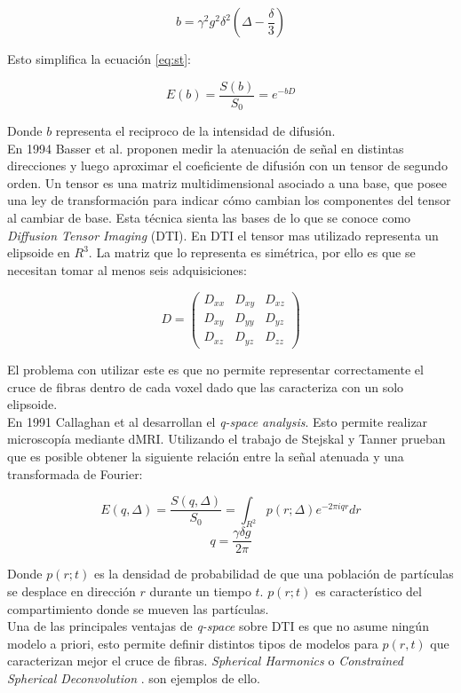 $$ b = \gamma^2 g^2 \delta^2 \left(\Delta - \frac{\delta}{3}\right) $$ 

Esto simplifica la ecuaci\'on \ref{eq:st}:  

$$ E(b) = \frac{S(b)}{S_0} = e^{-b D} $$

Donde $b$ representa el reciproco de la intensidad de difusi\'on. \\

En 1994 Basser et al. \cite{Basser1994} proponen medir la atenuaci\'on de se\~nal
en distintas direcciones y luego aproximar el coeficiente de difusi\'on con un 
tensor de segundo orden. Un tensor es una matriz multidimensional asociado a una
base, que posee una ley de transformaci\'on  para indicar  c\'omo cambian los 
componentes del tensor al cambiar de base. Esta t\'ecnica sienta las bases de lo
que se conoce como \textit{Diffusion Tensor Imaging} (DTI). En DTI el tensor 
mas utilizado representa un elipsoide en $R^3$. La matriz que lo representa
es  sim\'etrica, por ello es que se necesitan tomar al menos seis adquisiciones: 

$$
    D =
    \begin{pmatrix}
             D_{xx} & D_{xy} & D_{xz} \\
             D_{xy} & D_{yy} & D_{yz} \\
             D_{xz} & D_{yz} & D_{zz}    
    \end{pmatrix}
$$

\vspace{0.1cm}

El problema con utilizar este es que no permite representar correctamente
el cruce de fibras dentro de cada voxel dado que las caracteriza con un solo
elipsoide.\\

En 1991 Callaghan et al \cite{Callaghan1991} desarrollan el \textit{q-space analysis}.
Esto permite realizar microscop\'ia mediante dMRI. Utilizando el trabajo de Stejskal
y Tanner prueban que es posible obtener la siguiente relaci\'on entre la se\~nal
atenuada y una transformada de Fourier:

$$E(q,\Delta) =  \frac{S(q,\Delta)}{S_0} = \int_{R^2}{p(r;\Delta)e^{-2\pi i q r} dr} $$
$$ q = \frac{\gamma \delta g}{2\pi} $$

Donde $p(r;t)$ es la densidad de probabilidad de que una poblaci\'on de 
part\'iculas se desplace en direcci\'on $r$ durante un tiempo $t$. $p(r;t)$ es
caracter\'istico del compartimiento donde se mueven las part\'iculas. \\

Una de las principales ventajas de \textit{q-space} sobre DTI es que no asume
ning\'un modelo a priori, esto permite definir distintos tipos de modelos para
$p(r,t)$ que caracterizan mejor el cruce de fibras. \textit{Spherical Harmonics}
\cite{Tuch2004} o \textit{Constrained Spherical Deconvolution} \cite{Tournier2004}.
son ejemplos de ello. \\

